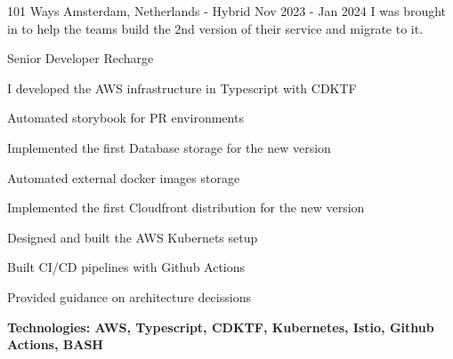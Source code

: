 


\begin{cventries}

{101 Ways}
{Amsterdam, Netherlands - Hybrid}
{Nov 2023 - Jan 2024}
{I was brought in to help the teams build the 2nd version of their service and migrate to it.}
\hfill\begin{minipage}{\dimexpr\textwidth-1cm}
\xdef\tpd{\the\prevdepth}
\begin{cventrystack}
	\cventry
	{Senior Developer} %
	{Recharge} %
	{}
	{}
	{
		\begin{cvitems}
			\item {I developed the AWS infrastructure in Typescript with CDKTF}
			\item {Automated storybook for PR environments}
			\item {Implemented the first Database storage for the new version}
			\item {Automated external docker images storage}
			\item {Implemented the first Cloudfront distribution for the new version}
			\item {Designed and built the AWS Kubernets setup}
			\item {Built CI/CD pipelines with Github Actions}
			\item {Provided guidance on architecture decissions}
			\item {\bfseries{Technologies:} AWS, Typescript, CDKTF, Kubernetes, Istio, Github Actions, BASH}
		\end{cvitems}
	}
\end{cventrystack}
\end{minipage}


\end{cventries}
